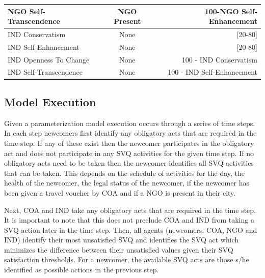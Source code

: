\documentclass{scspaperproc}
\theoremstyle{scsthe}
\begin{document}
\begin{table}[ht]
\begin{center}
{\begin{tabular}{|lcr|}
\hline
NGO Self-Transcendence                                                                                      & NGO Present           &  100-NGO Self-Enhancement   \\
\hline
IND Conservatism                                                                                            & None                  & {[}20-80{]}                \\
\hline
IND Self-Enhancement                                                                                        & None                  & {[}20-80{]}                \\
\hline
IND Openness To Change                                                                                      & None                  &  100 - IND Conservatism     \\
\hline
IND Self-Transcendence                                                                                      & None                  &  100 - IND Self-Enhancement \\
\hline
\end{tabular}}
\end{center}
\end{table}

\subsection{Model Execution}
Given a parameterization model execution occurs through a series of time steps. In each step newcomers first identify any obligatory acts that are required in the time step. If any of these exist then the newcomer participates in the obligatory act and does not participate in any SVQ activities for the given time step. If no obligatory acts need to be taken then the newcomer identifies all SVQ activities that can be taken. This depends on the schedule of activities for the day, the health of the newcomer, the legal status of the newcomer, if the newcomer has been given a travel voucher by COA and if a NGO is present in their city. 

Next, COA and IND take any obligatory acts that are required in the time step. It is important to note that this does not preclude COA and IND from taking a SVQ action later in the time step. Then, all agents (newcomers, COA, NGO and IND) identify their most unsatisfied SVQ and identifies the SVQ act which minimizes the difference between their unsatisfied values given their SVQ satisfaction thresholds. For a newcomer, the available SVQ acts are those s/he identified as possible actions in the previous step.   
\end{document}
